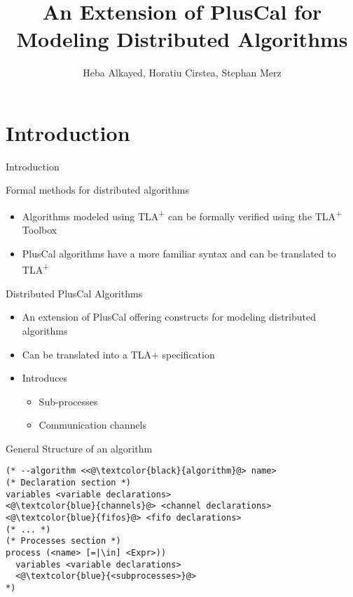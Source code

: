 \documentclass{beamer}
\title[Your Short Title]{An Extension of PlusCal for Modeling
Distributed Algorithms}
\institute{University of Lorraine, CNRS, Inria, Nancy, France}
\author[]{Heba Alkayed, Horatiu Cirstea, Stephan Merz}
\newcommand{\tlaplus}{TLA\textsuperscript{+}\xspace}
\begin{document}
\begin{frame}
  \titlepage
\end{frame}


\section{Introduction}

\begin{frame}{Introduction}

\begin{block}{Formal methods for distributed algorithms}
\begin{itemize}

  \item Algorithms modeled using \tlaplus can be formally verified using the \tlaplus Toolbox
 \item PlusCal algorithms have a more familiar syntax and can be translated to \tlaplus 
\end{itemize}
\end{block}
\vskip 1cm

\end{frame}

\begin{frame}[fragile]{Distributed PlusCal Algorithms}

\begin{itemize}
  \item An extension of PlusCal offering constructs for modeling distributed algorithms 
  \item Can be translated into a TLA+ specification
  \item Introduces
  \begin{itemize} 
        \item Sub-processes
        \item Communication channels
    \end{itemize}
\end{itemize}

\end{frame}


\begin{frame}[fragile]{General Structure of an algorithm}
\begin{lstlisting}[language=pluscal, frame = tlrb, numbers = none]
(* --algorithm <<@\textcolor{black}{algorithm}@> name>
(* Declaration section *)
variables <variable declarations>
<@\textcolor{blue}{channels}@> <channel declarations>
<@\textcolor{blue}{fifos}@> <fifo declarations>
(* ... *)
(* Processes section *)
process (<name> [=|\in] <Expr>))
  variables <variable declarations>
  <@\textcolor{blue}{<subprocesses>}@>
*)
\end{lstlisting}
\end{frame}
\end{document}
